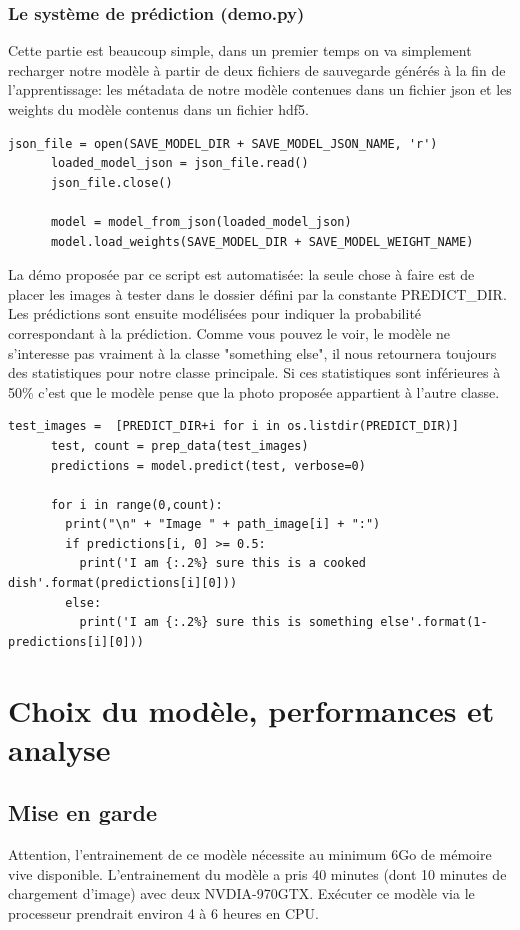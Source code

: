 \documentclass[a4paper,12pt]{report}
\begin{document}
      \subsection{Le système de prédiction (demo.py)}
      Cette partie est beaucoup simple, dans un premier temps on va simplement recharger notre modèle à partir de deux fichiers de sauvegarde générés à la fin de l'apprentissage: les métadata de notre modèle contenues dans un fichier json et les weights du modèle contenus dans un fichier hdf5.
      \begin{lstlisting}[title=test.py (l.32)]
      json_file = open(SAVE_MODEL_DIR + SAVE_MODEL_JSON_NAME, 'r')
      loaded_model_json = json_file.read()
      json_file.close()

      model = model_from_json(loaded_model_json)
      model.load_weights(SAVE_MODEL_DIR + SAVE_MODEL_WEIGHT_NAME)
      \end{lstlisting}

      \medbreak
      La démo proposée par ce script est automatisée: la seule chose à faire est de placer les images à tester dans le dossier défini par la constante PREDICT\_DIR. Les prédictions sont ensuite modélisées pour indiquer la probabilité correspondant à la prédiction. Comme vous pouvez le voir, le modèle ne s'interesse pas vraiment à la classe "something else", il nous retournera toujours des statistiques pour notre classe principale. Si ces statistiques sont inférieures à 50\% c'est que le modèle pense que la photo proposée appartient à l'autre classe.
      \begin{lstlisting}[title=test.py (l.194)]
      test_images =  [PREDICT_DIR+i for i in os.listdir(PREDICT_DIR)]
      test, count = prep_data(test_images)
      predictions = model.predict(test, verbose=0)

      for i in range(0,count):
        print("\n" + "Image " + path_image[i] + ":")
        if predictions[i, 0] >= 0.5: 
          print('I am {:.2%} sure this is a cooked dish'.format(predictions[i][0]))
        else: 
          print('I am {:.2%} sure this is something else'.format(1-predictions[i][0]))
      \end{lstlisting}


  \chapter{Choix du modèle, performances et analyse}

    \section{Mise en garde}
    Attention, l'entrainement de ce modèle nécessite au minimum 6Go de mémoire vive disponible. L'entrainement du modèle a pris 40 minutes (dont 10 minutes de chargement d'image) avec deux NVDIA-970GTX. Exécuter ce modèle via le processeur prendrait environ 4 à 6 heures en CPU.
\end{document}
